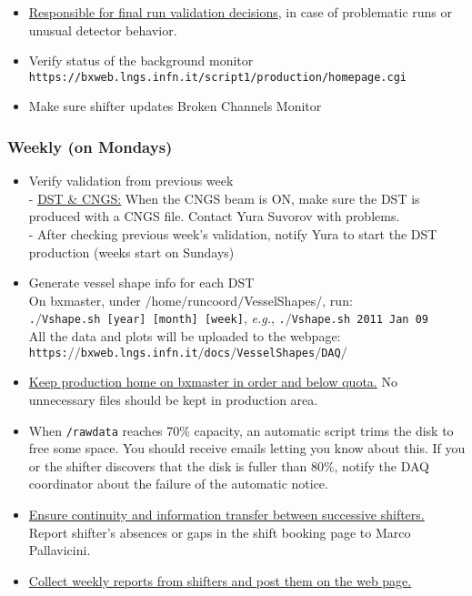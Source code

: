 \documentclass[a4paper,10pt]{article}
\begin{document}
\begin{itemize}
\item \underline{Responsible for final run validation decisions}, in case of problematic runs or unusual detector behavior.
 \item Verify status of the background monitor \\
{\tt https://bxweb.lngs.infn.it/script1/production/homepage.cgi}
 \item Make sure shifter updates Broken Channels Monitor
\end{itemize}

 \subsubsection{Weekly (on Mondays)}
\begin{itemize}
 \item Verify validation from previous week  \\
  - \underline{DST \& CNGS:} When the CNGS beam is ON, make sure the DST is produced with a CNGS file. Contact Yura Suvorov with problems. \\
  - After checking previous week's validation, notify Yura to start the DST production (weeks start on Sundays)

 \item Generate vessel shape info for each DST\\
On bxmaster, under $/$home$/$runcoord$/$VesselShapes$/$, run: \\
    {\tt .$/$Vshape.sh [year] [month] [week]}, \textit{e.g.}, {\tt .$/$Vshape.sh~2011~Jan~09} \\
All the data and plots will be uploaded to the webpage: \\
    {\tt https:$//$bxweb.lngs.infn.it$/$docs$/$VesselShapes$/$DAQ$/$}
\item \underline{Keep production home on bxmaster in order and below quota.}  No unnecessary files should be kept in production area.
\item When {\tt /rawdata} reaches 70\% capacity, an automatic script trims the disk to free some space. You should receive emails letting you know about this. If you or the shifter discovers that the disk is fuller than 80\%, notify the DAQ coordinator about the failure of the automatic notice.
\item \underline{Ensure continuity and information transfer between successive shifters.}  Report shifter's absences or gaps in the shift booking page to Marco Pallavicini.
\item \underline{Collect weekly reports from shifters and post them on the web page.}
\end{itemize}
\end{document}
